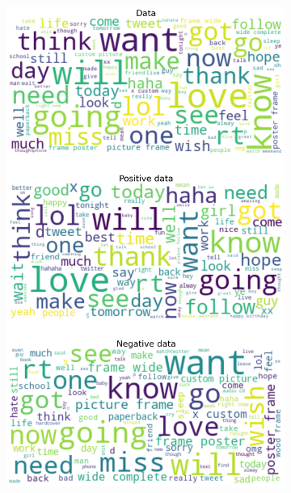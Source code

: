 \documentclass{article}
\begin{document}
\begin{itemize}
\begin{figure}[H]
\begin{subfigure}[b]{0.24\textwidth}
\includegraphics[width=\textwidth]{chapter-06/section-01-01/06/visualization/2/wordcloud.png}
\end{subfigure}
\begin{subfigure}[b]{0.24\textwidth}
\centering

\end{subfigure}
\end{figure}
\end{itemize}
\end{document}
